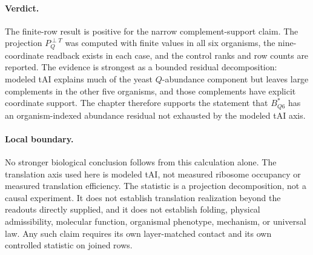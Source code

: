 \paragraph{Verdict.}
The finite-row result is positive for the narrow complement-support claim.  The projection $P_Q^{\perp T}$ was computed with finite values in all six organisms, the nine-coordinate readback exists in each case, and the control ranks and row counts are reported.  The evidence is strongest as a bounded residual decomposition: modeled tAI explains much of the yeast $Q$-abundance component but leaves large complements in the other five organisms, and those complements have explicit coordinate support.  The chapter therefore supports the statement that $B^*_{Q6}$ has an organism-indexed abundance residual not exhausted by the modeled tAI axis.

\paragraph{Local boundary.}
No stronger biological conclusion follows from this calculation alone.  The translation axis used here is modeled tAI, not measured ribosome occupancy or measured translation efficiency.  The statistic is a projection decomposition, not a causal experiment.  It does not establish translation realization beyond the readouts directly supplied, and it does not establish folding, physical admissibility, molecular function, organismal phenotype, mechanism, or universal law.  Any such claim requires its own layer-matched contact and its own controlled statistic on joined rows.